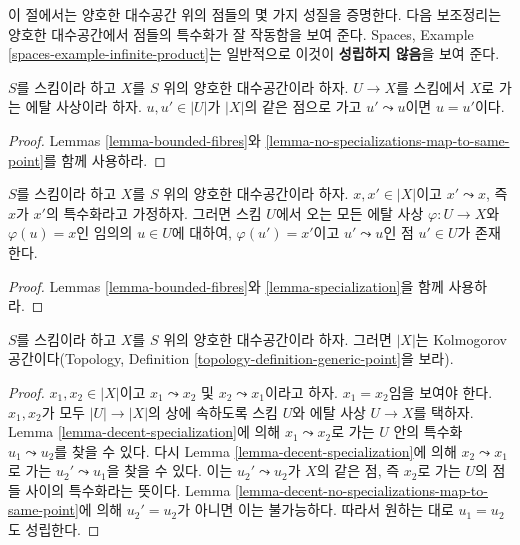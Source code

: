 \noindent
이 절에서는 양호한 대수공간 위의 점들의 몇 가지 성질을 증명한다.
다음 보조정리는 양호한 대수공간에서 점들의 특수화가 잘 작동함을
보여 준다. Spaces, Example \ref{spaces-example-infinite-product}는
일반적으로 이것이 {\bf 성립하지 않음}을 보여 준다.

\begin{lemma}
\label{lemma-decent-no-specializations-map-to-same-point}
$S$를 스킴이라 하고 $X$를 $S$ 위의 양호한 대수공간이라 하자.
$U \to X$를 스킴에서 $X$로 가는 에탈 사상이라 하자.
$u, u' \in |U|$가 $|X|$의 같은 점으로 가고 $u' \leadsto u$이면
$u = u'$이다.
\end{lemma}

\begin{proof}
Lemmas \ref{lemma-bounded-fibres}와
\ref{lemma-no-specializations-map-to-same-point}를 함께 사용하라.
\end{proof}

\begin{lemma}
\label{lemma-decent-specialization}
$S$를 스킴이라 하고 $X$를 $S$ 위의 양호한 대수공간이라 하자.
$x, x' \in |X|$이고 $x' \leadsto x$, 즉 $x$가 $x'$의 특수화라고
가정하자. 그러면 스킴 $U$에서 오는 모든 에탈 사상
$\varphi : U \to X$와 $\varphi(u) = x$인 임의의 $u \in U$에 대하여,
$\varphi(u') = x'$이고 $u' \leadsto u$인 점 $u'\in U$가 존재한다.
\end{lemma}

\begin{proof}
Lemmas \ref{lemma-bounded-fibres}와 \ref{lemma-specialization}을 함께
사용하라.
\end{proof}

\begin{lemma}
\label{lemma-kolmogorov}
$S$를 스킴이라 하고 $X$를 $S$ 위의 양호한 대수공간이라 하자.
그러면 $|X|$는 Kolmogorov 공간이다(Topology, Definition
\ref{topology-definition-generic-point}을 보라).
\end{lemma}

\begin{proof}
$x_1, x_2 \in |X|$이고 $x_1 \leadsto x_2$ 및
$x_2 \leadsto x_1$이라고 하자. $x_1 = x_2$임을 보여야 한다.
$x_1, x_2$가 모두 $|U| \to |X|$의 상에 속하도록 스킴 $U$와 에탈 사상
$U \to X$를 택하자. Lemma \ref{lemma-decent-specialization}에 의해
$x_1 \leadsto x_2$로 가는 $U$ 안의 특수화
$u_1 \leadsto u_2$를 찾을 수 있다. 다시 Lemma
\ref{lemma-decent-specialization}에 의해 $x_2 \leadsto x_1$로 가는
$u_2' \leadsto u_1$을 찾을 수 있다. 이는 $u_2' \leadsto u_2$가 $X$의
같은 점, 즉 $x_2$로 가는 $U$의 점들 사이의 특수화라는 뜻이다.
Lemma \ref{lemma-decent-no-specializations-map-to-same-point}에 의해
$u_2' = u_2$가 아니면 이는 불가능하다. 따라서 원하는 대로
$u_1 = u_2$도 성립한다.
\end{proof}

